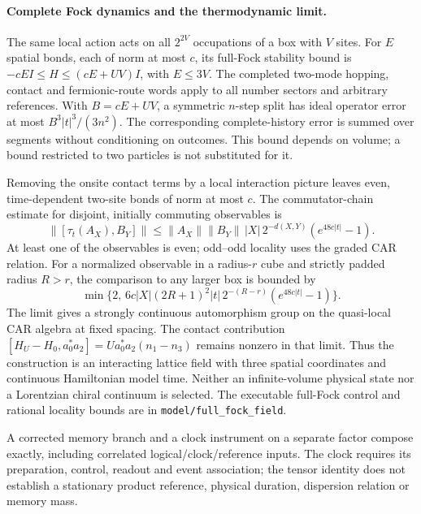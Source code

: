 \paragraph{Complete Fock dynamics and the thermodynamic limit.}
The same local action acts on all $2^{2V}$ occupations of a box with $V$
sites. For $E$ spatial bonds, each of norm at most $c$, its full-Fock
stability bound is $-cE I\le H\le(cE+UV)I$, with $E\le3V$.
The completed two-mode hopping, contact and fermionic-route words apply to
all number sectors and arbitrary references. With $B=cE+UV$, a symmetric
$n$-step split has ideal operator error at most $B^3|t|^3/(3n^2)$.
The corresponding complete-history error is summed over segments without
conditioning on outcomes. This bound depends on volume; a bound restricted
to two particles is not substituted for it.

Removing the onsite contact terms by a local interaction picture leaves
even, time-dependent two-site bonds of norm at most $c$. The commutator-chain
estimate for disjoint, initially commuting observables is
\[
 \|[\tau_t(A_X),B_Y]\|
 \le \|A_X\|\|B_Y\|\,|X|\,2^{-d(X,Y)}(e^{48c|t|}-1).
\]
At least one of the observables is even; odd--odd locality uses the graded
CAR relation. For a normalized observable in a radius-$r$ cube and strictly
padded radius $R>r$, the comparison to any larger box is bounded by
\[
 \min\{2,\,6c|X|(2R+1)^2|t|\,2^{-(R-r)}(e^{48c|t|}-1)\}.
\]
The limit gives a strongly continuous automorphism group on the quasi-local
CAR algebra at fixed spacing. The contact contribution
$[H_U-H_0,a_0^*a_2]=U a_0^*a_2(n_1-n_3)$ remains nonzero in that limit.
Thus the construction is an interacting lattice field with three spatial
coordinates and continuous Hamiltonian model time. Neither an infinite-volume
physical state nor a Lorentzian chiral continuum is selected. The executable
full-Fock control and rational locality bounds are in
\texttt{model/full\_fock\_field}.

A corrected memory branch and a clock instrument on a separate factor
compose exactly, including correlated logical/clock/reference inputs.
The clock requires its preparation, control, readout and event association;
the tensor identity does not establish a stationary product reference,
physical duration, dispersion relation or memory mass.

